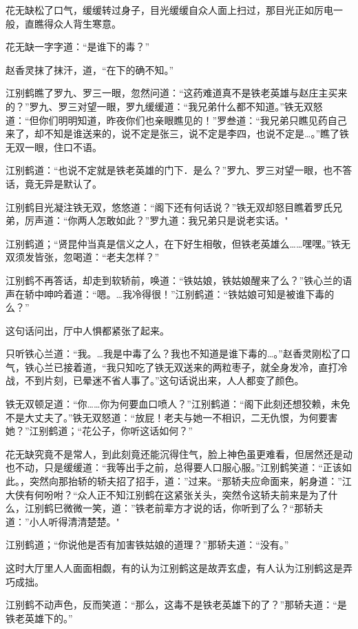\documentclass[12pt,oneside]{book}
\begin{document}
花无缺松了口气，缓缓转过身子，目光缓缓自众人面上扫过，那目光正如厉电一般，直瞧得众人背生寒意。

花无缺一字字道：``是谁下的毒？''

赵香灵抹了抹汗，道，``在下的确不知。''

江别鹤瞧了罗九、罗三一眼，忽然问道：``这药难道真不是铁老英雄与赵庄主买来的？''罗九、罗三对望一眼，罗九缓缓道：``我兄弟什么都不知道。''铁无双怒道：``但你们明明知道，昨夜你们也亲眼瞧见的！''罗叁道：``我兄弟只瞧见药自己来了，却不知是谁送来的，说不定是张三，说不定是李四，也说不定是\ldots。''瞧了铁无双一眼，住口不语。

江别鹤道：``也说不定就是铁老英雄的门下．是么？''罗九、罗三对望一眼，也不答话，竟无异是默认了。

江别鹤目光凝注铁无双，悠悠道：``阁下还有何话说？''铁无双却怒目瞧着罗氏兄弟，厉声道：``你两人怎敢如此？''罗九道：我兄弟只是说老实话。"

江别鹤道；``贤昆仲当真是信义之人，在下好生相敬，但铁老英雄么\ldots\ldots 嘿嘿。''铁无双须发皆张，忽喝道：``老夫怎样？''

江别鹤不再答话，却走到软轿前，唤道：``铁姑娘，铁姑娘醒来了么？''铁心兰的语声在轿中呻吟着道：``嗯。\ldots 我冷得很！''江别鹤道：``铁姑娘可知是被谁下毒的么？''

这句话问出，厅中人惧都紧张了起来。

只听铁心兰道：``我。\ldots 我是中毒了么？我也不知道是谁下毒的\ldots。''赵香灵刚松了口气，铁心兰已接着道，``我只知吃了铁无双送来的两粒枣子，就全身发冷，直打冷战，不到片刻，已晕迷不省人事了。''这句话说出来，人人都变了颜色。

铁无双顿足道：``你\ldots\ldots 你为何要血口喷人？''江别鹤道：``阁下此刻还想狡赖，未免不是大丈夫了。''铁无双怒道：``放屁！老夫与她一不相识，二无仇恨，为何要害她？''江别鹤道；``花公子，你听这话如何？''

花无缺究竟不是常人，到此刻竟还能沉得住气，脸上神色虽更难看，但居然还是动也不动，只是缓缓道：``我等出手之前，总得要人口服心服。''江别鹤笑道：``正该如此。，突然向那抬轿的轿夫招了招手，道：''过来。``那轿夫应命面来，躬身道：''江大侠有何吩咐？``众人正不知江别鹤在这紧张关头，突然令这轿夫前来是为了什么，江别鹤巳微微一笑，道：''铁老前辈方才说的话，你听到了么？``那轿夫道：''小人听得清清楚楚。"

江别鹤道；``你说他是否有加害铁姑娘的道理？''那轿夫道：``没有。''

这时大厅里人人面面相觑，有的认为江别鹤这是故弄玄虚，有人认为江别鹤这是弄巧成拙。

江别鹤不动声色，反而笑道：``那么，这毒不是铁老英雄下的了？''那轿夫道：``是铁老英雄下的。''
\end{document}
